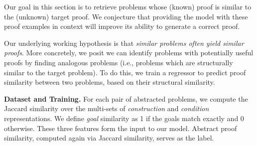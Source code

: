 




Our goal in this section is to retrieve problems whose (known) proof is similar to the (unknown) target proof. We conjecture that providing the model with these proof examples in context will improve its ability to generate a correct proof.

Our underlying working hypothesis is that \emph{similar problems often yield similar proofs}.
%
%
More concretely, we posit we can identify problems with potentially useful proofs by finding analogous problems (i.e., problems which are structurally similar to the target problem). To do this, we train a regressor to predict proof similarity between two problems, based on their structural similarity.





\noindent\textbf{Dataset and Training.}  
For each pair of abstracted problems, we compute the Jaccard similarity over the multi-sets of \emph{construction} and \emph{condition}  representations. We define \emph{goal} similarity as 1 if the goals match exactly and 0 otherwise. These three features form the input to our model. Abstract proof similarity, computed again via Jaccard similarity, serves as the label.



